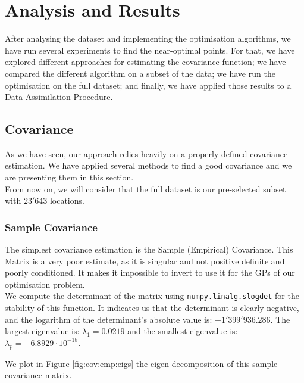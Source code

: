 \chapter{Analysis and Results} \label{chap:results}


After analysing the dataset and implementing the optimisation algorithms, we have run several experiments to find the near-optimal points. For that, we have explored different approaches for estimating the covariance function; we have compared the different algorithm on a subset of the data;  we have run the optimisation on the full dataset; and finally, we have applied those results to a Data Assimilation Procedure. 


\section{Covariance}

As we have seen, our approach relies heavily on a properly defined covariance estimation. We have applied several methods to find a good covariance and we are presenting them in this section. \\

From now on, we will consider that the full dataset is our pre-selected subset with $23'643$ locations. 

\subsection{Sample Covariance}

The simplest covariance estimation is the Sample (Empirical) Covariance. This Matrix is a very poor estimate, as it is singular and not positive definite and poorly conditioned. It makes it impossible to invert to use it for the GPs of our optimisation problem. \\ 

We compute the determinant of the matrix using \texttt{numpy.linalg.slogdet} for the stability of this function. It indicates us that the determinant is clearly negative, and the logarithm of the determinant's absolute value is: $-1'399'936.286$. The largest eigenvalue is: $\lambda_1 = 0.0219$ and the smallest eigenvalue is: $\lambda_p = -6.8929 \cdot 10^{-18}$.

We plot in Figure \ref{fig:cov:emp:eigs} the eigen-decomposition of this sample covariance matrix.

